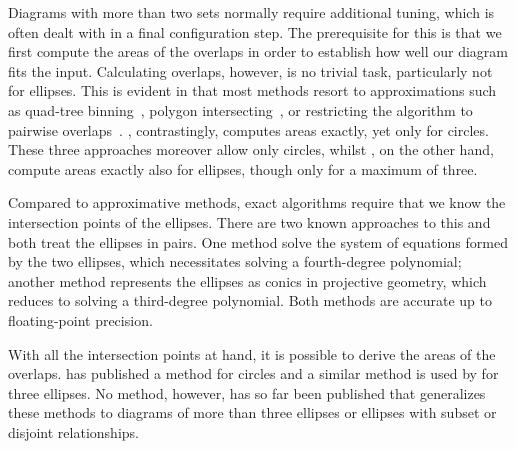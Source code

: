 \documentclass[
  oneside,
  openany,
  numbers=noendperiod,
  parskip=half,
  bibliography=totoc
]{scrbook}\usepackage[]{graphicx}\usepackage{xcolor}
\begin{document}
Diagrams with more than two sets normally require additional tuning, which is often
dealt with in a final configuration step. The prerequisite for this is that
we first compute the areas of the overlaps in order to establish how well our
diagram fits the input. Calculating overlaps, however, is no trivial task,
particularly not for ellipses. This is evident in that most methods resort to
approximations such as quad-tree binning~\citep{Wilkinson_2012}, polygon
intersecting~\citep{Kestler_2008}, or restricting the algorithm to pairwise
overlaps~\citep{Swinton_2011}. \citet{Frederickson_2016}, contrastingly,
computes areas exactly, yet only for circles. These three approaches moreover allow only
circles, whilst \citet{Micallef_2014a}, on the other hand, compute areas exactly
also for ellipses, though only for a maximum of three.

Compared to approximative methods, exact algorithms require that we
know the intersection points of the ellipses. There are
two known approaches to this and both treat the ellipses in pairs. One method
solve the system of equations formed by the two
ellipses, which necessitates solving a fourth-degree
polynomial; another method represents the ellipses as
conics in projective geometry, which reduces to solving a third-degree polynomial.
Both methods are accurate up to floating-point precision.

With all the intersection points at hand, it is possible to derive the areas of the overlaps.
\citet{Frederickson_2013} has published a method for circles
and a similar method is used by \citet{Micallef_2014a} for three ellipses. No
method, however, has so far been published that
generalizes these methods to diagrams of more than three ellipses or ellipses
with subset or disjoint relationships.
\end{document}
